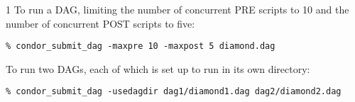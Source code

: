 \begin{ManPage}{\label{man-condor-submit-dag}}{1}
To run a DAG, limiting the number of concurrent PRE scripts to 10
and the number of concurrent POST scripts to five:
\begin{verbatim}
% condor_submit_dag -maxpre 10 -maxpost 5 diamond.dag
\end{verbatim}

To run two DAGs, each of which is set up to run in its own directory:
\begin{verbatim}
% condor_submit_dag -usedagdir dag1/diamond1.dag dag2/diamond2.dag
\end{verbatim}

\end{ManPage}

